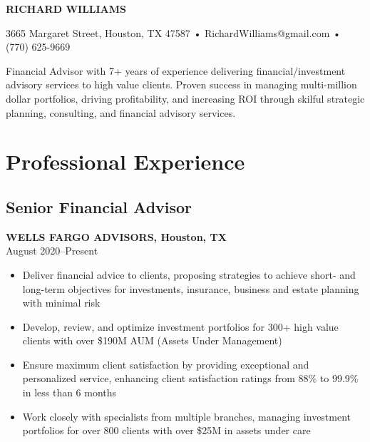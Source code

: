 \documentclass[11pt,a4paper]{article}
\begin{document}
{\huge\bfseries\color{headingcolor} RICHARD WILLIAMS}

{\small
3665 Margaret Street, Houston, TX 47587 • RichardWilliams@gmail.com • (770) 625-9669
}

\noindent{\color{headingcolor}\rule{\linewidth}{0.4pt}}

{\small Financial Advisor with 7+ years of experience delivering financial/investment advisory services to high value clients. Proven success in managing multi-million dollar portfolios, driving profitability, and increasing ROI through skilful strategic planning, consulting, and financial advisory services.}

\section{Professional Experience}

\subsection{Senior Financial Advisor}
\vspace{-0.5em}
\textbf{WELLS FARGO ADVISORS, Houston, TX}\\
August 2020--Present
\vspace{-0.5em}
\begin{itemize}
    \item Deliver financial advice to clients, proposing strategies to achieve short- and long-term objectives for investments, insurance, business and estate planning with minimal risk
    \item Develop, review, and optimize investment portfolios for 300+ high value clients with over \$190M AUM (Assets Under Management)
    \item Ensure maximum client satisfaction by providing exceptional and personalized service, enhancing client satisfaction ratings from 88\% to 99.9\% in less than 6 months
    \item Work closely with specialists from multiple branches, managing investment portfolios for over 800 clients with over \$25M in assets under care
\end{itemize}
\end{document}
